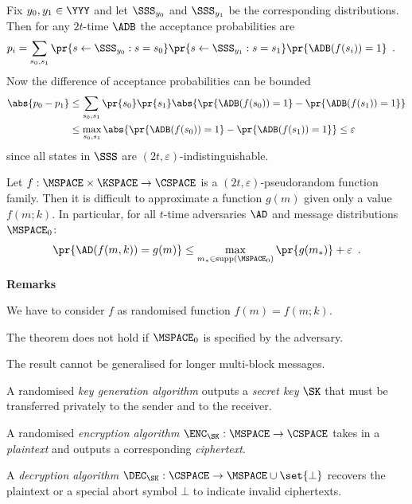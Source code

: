 \documentclass[landscape,footrule]{foils}
\newcommand{\lastline}{\vspace*{-2ex}}
\begin{document}

Fix $y_0,y_1\in\YYY$ and let $\SSS_{y_0}$ and $\SSS_{y_1}$ be the
corresponding distributions. Then for any $2t$-time $\ADB$ the
acceptance probabilities are
\begin{align*}
  p_i%
  &=\sum_{s_0,s_1}\pr{s\gets\SSS_{y_0}:s=s_0}
  \pr{s\gets\SSS_{y_1}:s=s_1}\pr{\ADB(f(s_i))=1}\enspace.
\end{align*}
Now the difference of acceptance probabilities can be bounded
\begin{align*}
  \abs{p_0-p_1}
  &\leq\sum_{s_0, s_1}\pr{s_0}\pr{s_1}\abs{\pr{\ADB(f(s_0))=1}-\pr{\ADB(f(s_1))=1}}\\
  &\leq\max_{s_0, s_1}\abs{\pr{\ADB(f(s_0))=1}-\pr{\ADB(f(s_1))=1}}\leq\varepsilon\enspace
\end{align*}
since all states in $\SSS$ are
$(2t,\varepsilon)$-indistinguishable.\lastline



Let $f:\MSPACE\times\KSPACE\to\CSPACE$ is a
$(2t,\varepsilon)$-pseudorandom function family. Then it is difficult
to approximate a function $g(m)$ given only a value $f(m;k)$. In
particular, for all $t$-time adversaries $\AD$ and message
distributions $\MSPACE_0$:
\begin{align*}
  \pr{\AD(f(m,k))=g(m)}
  \leq \max_{m_*\in\supp(\MSPACE_0)}\pr{g(m_*)} + \varepsilon\enspace.
\end{align*}
\bigskip
\bigskip

\textbf{Remarks}
\begin{triangles}
\item We have to consider $f$ as randomised function $f(m)=f(m;k)$. 
\item The theorem does not hold if $\MSPACE_0$ is specified by the
  adversary.
\item The result cannot be generalised for longer multi-block messages.
\lastline
\end{triangles}




\vspace*{1ex}
\begin{triangles}
\item A randomised \emph{key generation algorithm} outputs a
  \emph{secret key} $\SK$ that must be transferred privately to the
  sender and to the receiver.
\item A randomised \emph{encryption algorithm}
  $\ENC_\SK:\MSPACE\to\CSPACE$ takes in a \emph{plaintext} and
  outputs a corresponding \emph{ciphertext}.
\item A \emph{decryption algorithm}
  $\DEC_\SK:\CSPACE\to\MSPACE\cup\set{\bot}$ recovers the plaintext or
  a special abort symbol $\bot$ to indicate invalid ciphertexts.
\end{triangles}
\end{document}
